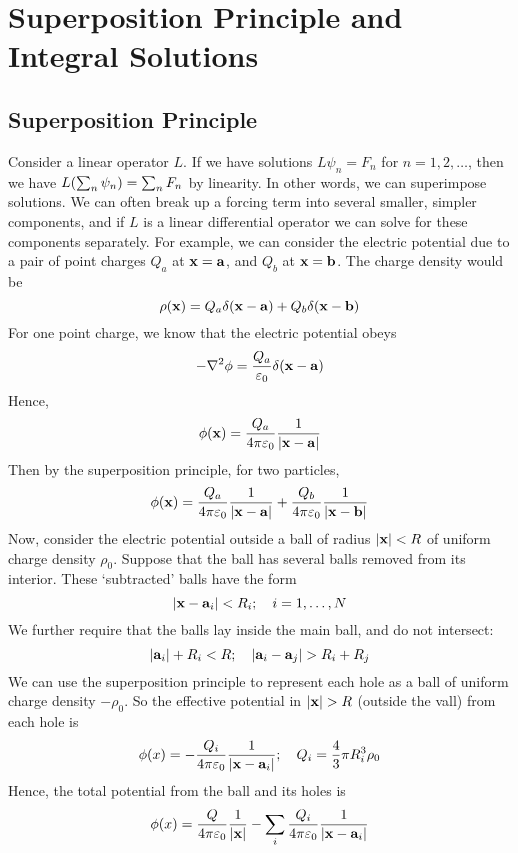 \documentclass{article}
\begin{document}
\section{Superposition Principle and Integral Solutions}
\subsection{Superposition Principle}
Consider a linear operator $L$. If we have solutions $L \psi_n = F_n$ for $n = 1, 2, \dots$, then we have $L\qty(\sum_n \psi_n) = \sum_n F_n$ by linearity. In other words, we can superimpose solutions. We can often break up a forcing term into several smaller, simpler components, and if $L$ is a linear differential operator we can solve for these components separately. For example, we can consider the electric potential due to a pair of point charges $Q_a$ at $\vb x = \vb a$, and $Q_b$ at $\vb x = \vb b$. The charge density would be
\[ \rho(\vb x) = Q_a \delta(\vb x - \vb a) + Q_b \delta(\vb x - \vb b) \]
For one point charge, we know that the electric potential obeys
\[ -\laplacian{\phi} = \frac{Q_a}{\varepsilon_0} \delta(\vb x - \vb a) \]
Hence,
\[ \phi(\vb x) = \frac{Q_a}{4\pi \varepsilon_0} \frac{1}{\abs{\vb x - \vb a}} \]
Then by the superposition principle, for two particles,
\[ \phi(\vb x) = \frac{Q_a}{4\pi \varepsilon_0} \frac{1}{\abs{\vb x - \vb a}} + \frac{Q_b}{4\pi \varepsilon_0} \frac{1}{\abs{\vb x - \vb b}} \]
Now, consider the electric potential outside a ball of radius $\abs{\vb x} < R$ of uniform charge density $\rho_0$. Suppose that the ball has several balls removed from its interior. These `subtracted' balls have the form
\[ \abs{\vb x - \vb a_i} < R_i;\quad i = 1, \dots, N \]
We further require that the balls lay inside the main ball, and do not intersect:
\[ \abs{\vb a_i} + R_i < R;\quad \abs{\vb a_i - \vb a_j} > R_i + R_j \]
We can use the superposition principle to represent each hole as a ball of uniform charge density $-\rho_0$. So the effective potential in $\abs{\vb x} > R$ (outside the vall) from each hole is
\[ \phi(x) = -\frac{Q_i}{4\pi\varepsilon_0} \frac{1}{\abs{\vb x - \vb a_i}};\quad Q_i = \frac{4}{3}\pi R_i^3 \rho_0 \]
Hence, the total potential from the ball and its holes is
\[ \phi(x) = \frac{Q}{4\pi\varepsilon_0} \frac{1}{\abs{\vb x}} - \sum_i\frac{Q_i}{4\pi\varepsilon_0} \frac{1}{\abs{\vb x - \vb a_i}} \]
\end{document}

